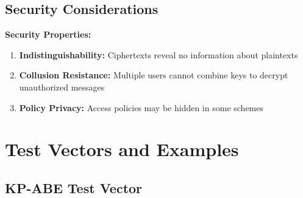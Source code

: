 \documentclass[11pt,a4paper]{article}
\begin{document}
\subsection{Security Considerations}

\begin{mathbox}
\textbf{Security Properties:}
\begin{enumerate}
    \item \textbf{Indistinguishability:} Ciphertexts reveal no information about plaintexts
    \item \textbf{Collusion Resistance:} Multiple users cannot combine keys to decrypt unauthorized messages
    \item \textbf{Policy Privacy:} Access policies may be hidden in some schemes
\end{enumerate}
\end{mathbox}

\section{Test Vectors and Examples}

\subsection{KP-ABE Test Vector}
\end{document}
